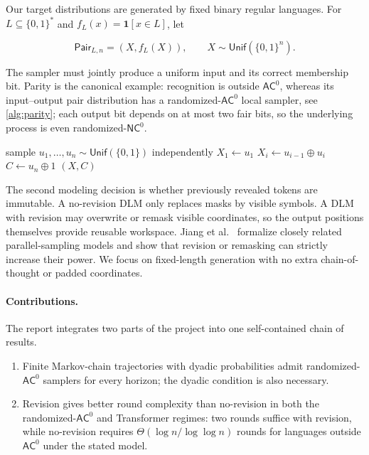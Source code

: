 \documentclass[10pt]{article}
\theoremstyle{definition}
\newcommand{\AC}{\mathsf{AC}}
\newcommand{\NC}{\mathsf{NC}}
\newcommand{\Pair}{\mathsf{Pair}}
\newcommand{\Unif}{\mathsf{Unif}}
\newcommand{\bits}{\{0,1\}}
\newcommand{\ind}{\mathbf{1}}
\begin{document}
Our target distributions are generated by fixed binary regular languages.
For $L\subseteq\bits^*$ and $f_L(x)=\ind[x\in L]$, let

\begin{equation}
  \Pair_{L,n}=(X,f_L(X)),\qquad X\sim\Unif(\bits^n).
  \label{eq:pair}
\end{equation}

The sampler must jointly produce a uniform input and its correct membership
bit.  Parity is the canonical example: recognition is outside $\AC^0$, whereas
its input--output pair distribution has a randomized-$\AC^0$ local sampler,
see \cref{alg:parity}; each output bit depends on at most two fair bits, so
the underlying process is even randomized-$\NC^0$.

\begin{algorithm}[ht]
\caption{Parity pair sampler in constant depth}
\label{alg:parity}
\begin{algorithmic}[1]
\State sample $u_1,\ldots,u_n\sim\Unif(\bits)$ independently
\State $X_1\gets u_1$
  \State $X_i\gets u_{i-1}\oplus u_i$
\EndFor
\State $C\gets u_n\oplus1$ 
\State \Return $(X,C)$
\end{algorithmic}
\end{algorithm}

The second modeling decision is whether previously revealed tokens are
immutable.  A no-revision DLM only replaces masks by visible symbols.  A DLM
with revision may overwrite or remask visible coordinates, so the output
positions themselves provide reusable workspace.  Jiang et al.~\cite{jiang2026dlm}
formalize closely related parallel-sampling models and show that revision or
remasking can strictly increase their power.  We focus on fixed-length
generation with no extra chain-of-thought or padded coordinates.

\paragraph{Contributions.}
The report integrates two parts of the project into one self-contained chain
of results.

\begin{enumerate}[leftmargin=*,itemsep=2pt]
  \item Finite Markov-chain trajectories with dyadic probabilities admit
  randomized-$\AC^0$ samplers for every horizon; the dyadic condition is also
  necessary.
  \item Revision gives better round complexity than no-revision in both the
  randomized-$\AC^0$ and Transformer regimes: two rounds
  suffice with revision, while no-revision requires
  $\Theta(\log n/\log\log n)$ rounds for languages outside $\AC^0$ under the
  stated model.
\end{enumerate}
\end{document}
